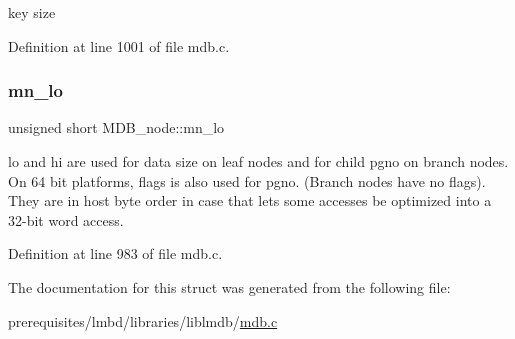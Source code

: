 key size 

Definition at line 1001 of file mdb.\+c.

\mbox{\label{struct_m_d_b__node_a4024788aea30105dcea5fcf6d4381404}} 
\subsubsection{\texorpdfstring{mn\+\_\+lo}{mn\_lo}}
{\footnotesize\ttfamily unsigned short M\+D\+B\+\_\+node\+::mn\+\_\+lo}

lo and hi are used for data size on leaf nodes and for child pgno on branch nodes. On 64 bit platforms, flags is also used for pgno. (Branch nodes have no flags). They are in host byte order in case that lets some accesses be optimized into a 32-\/bit word access. 

Definition at line 983 of file mdb.\+c.



The documentation for this struct was generated from the following file\+:\begin{DoxyCompactItemize}
\item 
prerequisites/lmbd/libraries/liblmdb/\mbox{\hyperlink{mdb_8c}{mdb.\+c}}\end{DoxyCompactItemize}
